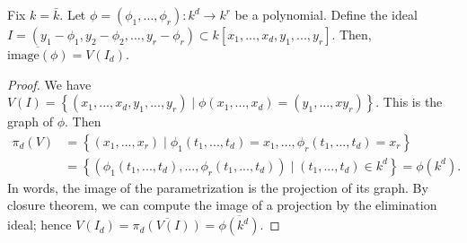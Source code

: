 \begin{mdframed}  
\begin{thm}
Fix \( k = \bar k \). Let \( \phi = (\phi_1, \dots, \phi_r): k^d \to k^r \) be a polynomial. Define the ideal \( I = (y_1 -  \phi_1, y_2 - \phi_2,\dots, y_r - \phi_r) \subset k [x_1, ..., x_d, y_1, ..., y_r] \). Then, \( \overline{\mathrm{image}(\phi)} = V(I_d).  \)
\end{thm}
\end{mdframed}

\begin{proof}
  We have \(   V(I) = \left\{ (x_1,...,x_d, y_1, ..., y_r) \mid \phi(x_1,...,x_d) = (y_1,..., xy_r) \right\}
  \).
This is the graph of \( \phi \). Then
\begin{align*}
  \pi_d(V) &= \left\{ (x_1, ..., x_r) \mid \phi_1(t_1,...,t_d) = x_1, ..., \phi_r(t_1,...,t_d) = x_r \right\} \\
  &= \left\{ (\phi_1(t_1,...,t_d), ... , \phi_r(t_1,..., t_d)) \mid (t_1,..., t_d) \in k^d \right\} = \phi(k^d).
\end{align*}
In words, the image of the parametrization is the projection of its graph. By closure theorem, we can compute the image of a projection by the elimination ideal; hence \( V(I_d) = \overline{\pi_d (V(I))} = \overline{\phi(k^d)} \).
\end{proof}

